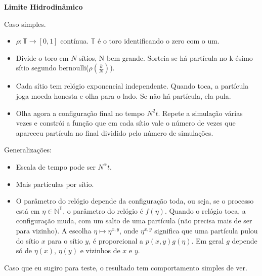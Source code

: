 \documentclass[letterpaper,12pt]{article}
\newcommand{\bb}[1]{{\mathbb #1}}
\begin{document}
\begin{center}
\textbf{\large{Limite Hidrodin\^amico}}\\
\end{center}

Caso simples.\\

\begin{itemize}
 \item $\rho:\mathbb {T}\rightarrow [0,1]$ cont\'inua. $\mathbb{T}$ \'e
o toro identificando o zero com o um.
\item Divide o toro em $N$ s\'itios, N bem grande. Sorteia se h\'a part\'icula no
k-\'esimo s\'itio segundo bernoulli($\rho(\frac{k}{N})$).
\item Cada s\'itio tem rel\'ogio exponencial independente. Quando toca, a 
part\'icula joga moeda honesta e olha para o lado. Se n\~ao h\'a part\'icula,
ela pula. 
\item Olha agora a configura\c c\~ao final no tempo $N^2t$. Repete a simula\c c\~ao
v\'arias vezes e constr\'oi a fun\c c\~ao que em cada s\'itio vale o n\'umero de vezes que apareceu part\'icula
no final dividido pelo n\'umero de simula\c c\~oes.\\
\end{itemize}


Generaliza\c c\~oes:\\

\begin{itemize}
 \item Escala de tempo pode ser $N^\alpha t$.
\item Mais part\'iculas por s\'itio.
\item O par\^ametro do rel\'ogio depende da configura\c c\~ao toda, ou seja, se o processo est\'a
em $\eta\in \bb{N}^{\bb{T}}$, o par\^ametro do rel\'ogio \'e $f(\eta)$. Quando o rel\'ogio toca, a configura\c c\~ao muda, com um salto de uma part\'icula (n\~ao precisa mais de ser para vizinho). A escolha $\eta\mapsto\eta^{x,y}$, onde $\eta^{x,y}$
significa que uma part\'icula pulou do s\'itio $x$ para o s\'itio $y$, \'e proporcional a 
$p(x,y)g(\eta)$. Em geral $g$ depende s\'o de $\eta(x)$, $\eta(y)$ e vizinhos de $x$ e $y$.\\
\end{itemize}

Caso que eu sugiro para teste, o resultado tem comportamento simples de ver.\\
\end{document}
